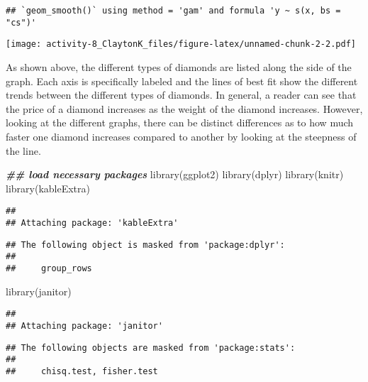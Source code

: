 \documentclass[
]{article}
\newenvironment{Shaded}{\begin{snugshade}}{\end{snugshade}}
\newcommand{\DocumentationTok}[1]{\textcolor[rgb]{0.56,0.35,0.01}{\textbf{\textit{#1}}}}
\newcommand{\FunctionTok}[1]{\textcolor[rgb]{0.00,0.00,0.00}{#1}}
\newcommand{\NormalTok}[1]{#1}
\begin{document}
\begin{verbatim}
## `geom_smooth()` using method = 'gam' and formula 'y ~ s(x, bs = "cs")'
\end{verbatim}

\texttt{[image: activity-8\_ClaytonK\_files/figure-latex/unnamed-chunk-2-2.pdf]}

As shown above, the different types of diamonds are listed along the
side of the graph. Each axis is specifically labeled and the lines of
best fit show the different trends between the different types of
diamonds. In general, a reader can see that the price of a diamond
increases as the weight of the diamond increases. However, looking at
the different graphs, there can be distinct differences as to how much
faster one diamond increases compared to another by looking at the
steepness of the line.

\begin{Shaded}
\begin{Highlighting}[]
\DocumentationTok{\#\# load necessary packages}
\FunctionTok{library}\NormalTok{(ggplot2)}
\FunctionTok{library}\NormalTok{(dplyr)}
\FunctionTok{library}\NormalTok{(knitr)}
\FunctionTok{library}\NormalTok{(kableExtra)}
\end{Highlighting}
\end{Shaded}

\begin{verbatim}
## 
## Attaching package: 'kableExtra'
\end{verbatim}

\begin{verbatim}
## The following object is masked from 'package:dplyr':
## 
##     group_rows
\end{verbatim}

\begin{Shaded}
\begin{Highlighting}[]
\FunctionTok{library}\NormalTok{(janitor)}
\end{Highlighting}
\end{Shaded}

\begin{verbatim}
## 
## Attaching package: 'janitor'
\end{verbatim}

\begin{verbatim}
## The following objects are masked from 'package:stats':
## 
##     chisq.test, fisher.test
\end{verbatim}
\end{document}
